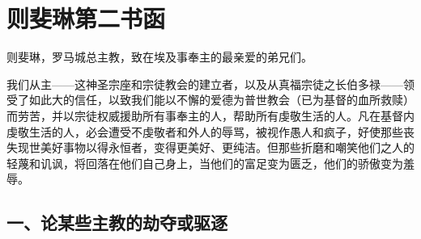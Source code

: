 
\section{则斐琳第二书函}

\par

则斐琳，罗马城总主教，致在埃及事奉主的最亲爱的弟兄们。\par

我们从主——这神圣宗座和宗徒教会的建立者，以及从真福宗徒之长伯多禄——领受了如此大的信任，以致我们能以不懈的爱德为普世教会（已为基督的血所救赎）而劳苦，并以宗徒权威援助所有事奉主的人，帮助所有虔敬生活的人。凡在基督内虔敬生活的人，必会遭受不虔敬者和外人的辱骂，被视作愚人和疯子，好使那些丧失现世美好事物以得永恒者，变得更美好、更纯洁。但那些折磨和嘲笑他们之人的轻蔑和讥讽，将回落在他们自己身上，当他们的富足变为匮乏，他们的骄傲变为羞辱。\par


\subsection{一、论某些主教的劫夺或驱逐}

